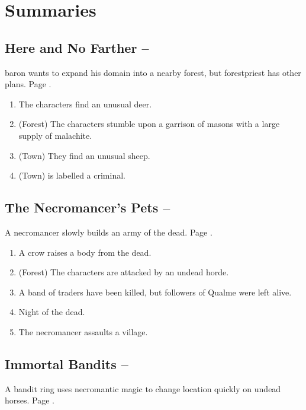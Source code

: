 \setcounter{encnum}{1}

\section{Summaries}

\subsection[Here and No Farther]{Here and No Farther -- \encnum}

\gls{baron} wants to expand his domain into a nearby forest, but \gls{forestpriest} has other plans.
Page \pageref{herenofarther}.

\begin{enumerate}
	\item{The characters find an unusual deer.}
	\item{(Forest) The characters stumble upon a garrison of masons with a large supply of malachite.}
	\item{(Town) They find an unusual sheep.}
	\item{(Town)  is labelled a criminal.}
\end{enumerate}

\subsection[The Necromancer's Pets]{The Necromancer's Pets -- \encnum}
A necromancer slowly builds an army of the dead.
Page \pageref{necromancerspet}.

\begin{enumerate}
	\item{A crow raises a body from the dead.}
	\item{(Forest) The characters are attacked by an undead horde.}
	\item{A band of traders have been killed, but followers of Qualme were left alive.}
	\item{Night of the dead.}
	\item{ The necromancer assaults a village.}
\end{enumerate}

\subsection[Immortal Bandits]{Immortal Bandits -- \encnum}
A bandit ring uses necromantic magic to change location quickly on undead horses.
Page \pageref{immortalbandits}.

